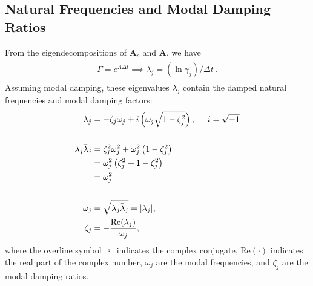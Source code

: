 \documentclass[letterpaper,10pt,english]{sphinxmanual}
\begin{document}
\subsection{Natural Frequencies and Modal Damping Ratios}
\label{\detokenize{theory/modes:natural-frequencies-and-modal-damping-ratios}}
\sphinxAtStartPar
From the eigendecompositions of \(\mathbf{A}_{c}\) and
\(\mathbf{A}\), we have
\begin{equation*}
\begin{split}\begin{aligned}
\Gamma = e^{\Lambda\Delta t}
\implies
\lambda_{j} = (\ln{\gamma_{j}})/\Delta t~.
\end{aligned}\end{split}
\end{equation*}
\sphinxAtStartPar
Assuming modal damping, these eigenvalues \(\lambda_{j}\) contain
the damped natural frequencies and modal damping factors:
\begin{equation*}
\begin{split}\begin{aligned}
\lambda_{j} &= -\zeta_{j}\omega_{j} \pm i\left(\omega_{j}\sqrt{1-\zeta_{j}^{2}}\right), \hspace{0.5cm} i=\sqrt{-1} \\ \\
\lambda_{j}\bar{\lambda}_{j} &= \zeta_{j}^{2}\omega_{j}^{2} + \omega_{j}^{2}\left(1-\zeta_{j}^{2}\right) \\
    &= \omega_{j}^{2}\left(\zeta_{j}^{2} + 1 - \zeta_{j}^{2}\right) \\
    &= \omega_{j}^{2} \\ \\
\omega_{j} &= \sqrt{\lambda_{j}\bar{\lambda}_{j}} = | \lambda_{j} |, \\
\zeta_{j} &= -\frac{\text{Re}(\lambda_{j})}{\omega_{j}},\\
\end{aligned}\end{split}
\end{equation*}
\sphinxAtStartPar
where the overline symbol \(~\overline{\cdot}~\) indicates the
complex conjugate, \(\text{Re}(\cdot)\) indicates the real part of
the complex number, \(\omega_{j}\) are the modal frequencies, and
\(\zeta_{j}\) are the modal damping ratios.
\end{document}
